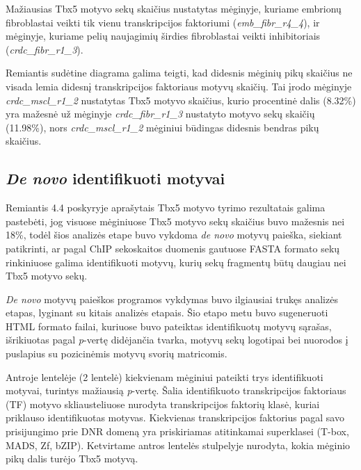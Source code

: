 \documentclass[12pt]{article}
\begin{document}
Mažiausias Tbx5 motyvo sekų skaičius nustatytas mėginyje, kuriame embrionų
fibroblastai veikti tik vienu transkripcijos faktoriumi
(\small\emph{emb\_fibr\_r4\_4}), ir mėginyje, kuriame pelių naujagimių
širdies fibroblastai veikti inhibitoriais
(\small\emph{crdc\_fibr\_r1\_3}).

Remiantis sudėtine diagrama galima teigti, kad didesnis mėginių pikų skaičius
ne visada lemia didesnį transkripcijos faktoriaus motyvų skaičių. Tai įrodo
mėginyje \small\emph{crdc\_mscl\_r1\_2} nustatytas Tbx5 motyvo skaičius,
kurio procentinė dalis (8.32\%) yra mažesnė už mėginyje
\small\emph{crdc\_fibr\_r1\_3} nustatyto motyvo sekų skaičių (11.98\%),
nors \small\emph{crdc\_mscl\_r1\_2} mėginiui būdingas didesnis bendras pikų
skaičius.

\newpage


\subsection{\emph{De novo} identifikuoti motyvai}
Remiantis 4.4 poskyryje aprašytais Tbx5 motyvo tyrimo rezultatais galima
pastebėti, jog visuose mėginiuose Tbx5 motyvo sekų skaičius buvo mažesnis
nei 18\%, todėl šios analizės etape buvo vykdoma \emph{de novo} motyvų
paieška, siekiant patikrinti, ar pagal ChIP sekoskaitos duomenis gautuose
FASTA formato sekų rinkiniuose galima identifikuoti motyvų, kurių sekų
fragmentų būtų daugiau nei Tbx5 motyvo sekų.

\emph{De novo} motyvų paieškos programos vykdymas buvo ilgiausiai trukęs
analizės etapas, lyginant su kitais analizės etapais. Šio etapo metu buvo
sugeneruoti HTML formato failai, kuriuose buvo pateiktas identifikuotų
motyvų sąrašas, išrikiuotas pagal \emph{p}-vertę didėjančia tvarka,
motyvų sekų logotipai bei nuorodos į puslapius su pozicinėmis motyvų
svorių matricomis.

Antroje lentelėje (2 lentelė) kiekvienam mėginiui pateikti trys identifikuoti
motyvai, turintys mažiausią \emph{p}-vertę.
Šalia identifikuoto transkripcijos faktoriaus (TF) motyvo skliausteliuose
nurodyta transkripcijos faktorių klasė, kuriai priklauso identifikuotas
motyvas. Kiekvienas transkripcijos faktorius pagal savo prisijungimo prie DNR
domeną yra priskiriamas atitinkamai superklasei (T-box, MADS, Zf, bZIP).
Ketvirtame antros lentelės stulpelyje nurodyta, kokia mėginio pikų dalis turėjo
Tbx5 motyvą.
\end{document}
